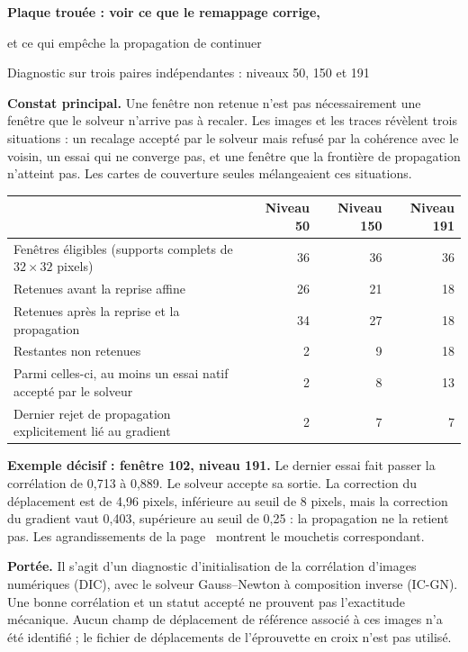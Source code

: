\documentclass[11pt,a4paper,landscape]{article}
\begin{document}
{\LARGE\bfseries Plaque trouée : voir ce que le remappage corrige,\par
et ce qui empêche la propagation de continuer\par}
\vspace{5mm}
{\large Diagnostic sur trois paires indépendantes : niveaux 50, 150 et 191}

\textbf{Constat principal.} Une fenêtre non retenue n'est pas nécessairement une fenêtre
que le solveur n'arrive pas à recaler. Les images et les traces révèlent trois situations :
un recalage accepté par le solveur mais refusé par la cohérence avec le voisin,
un essai qui ne converge pas, et une fenêtre que la frontière de propagation n'atteint pas.
Les cartes de couverture seules mélangeaient ces situations.

\begin{center}
\begin{tabular}{lrrr}
\toprule
 & Niveau 50 & Niveau 150 & Niveau 191\\\midrule
Fenêtres éligibles (supports complets de $32\times32$ pixels) &36&36&36\\
Retenues avant la reprise affine &26&21&18\\
Retenues après la reprise et la propagation &34&27&18\\
Restantes non retenues &2&9&18\\
Parmi celles-ci, au moins un essai natif accepté par le solveur &2&8&13\\
Dernier rejet de propagation explicitement lié au gradient &2&7&7\\
\bottomrule
\end{tabular}
\end{center}

\textbf{Exemple décisif : fenêtre 102, niveau 191.} Le dernier essai fait passer la
corrélation de 0,713 à 0,889. Le solveur accepte sa sortie. La correction du déplacement
est de 4,96 pixels, inférieure au seuil de 8 pixels, mais la correction du gradient vaut
0,403, supérieure au seuil de 0,25 : la propagation ne la retient pas.
Les agrandissements de la page~\pageref{page:191patch} montrent le mouchetis correspondant.

\textbf{Portée.} Il s'agit d'un diagnostic d'initialisation de la corrélation d'images
numériques (DIC), avec le solveur Gauss--Newton à composition inverse (IC-GN).
Une bonne corrélation et un statut accepté ne prouvent pas l'exactitude mécanique.
Aucun champ de déplacement de référence associé à ces images n'a été identifié ;
le fichier de déplacements de l'éprouvette en croix n'est pas utilisé.
\end{document}
